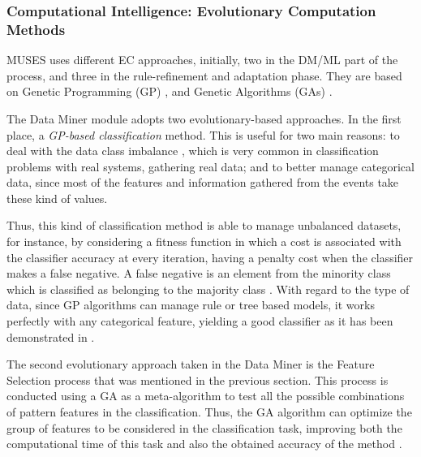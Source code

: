 
%
\subsubsection{Computational Intelligence: Evolutionary Computation Methods}
\label{subsec:ci}


MUSES uses different EC approaches, initially, two in the DM/ML part of the process, and three in the rule-refinement and adaptation phase. They are based on Genetic Programming (GP) \cite{GP_Koza92}, and Genetic Algorithms (GAs) \cite{GAs_Goldberg89}.

The Data Miner module adopts two evolutionary-based approaches. In the first place, a \textit{GP-based classification} method. This is useful for two main reasons: to deal with the data class imbalance \cite{imbalance_techniques_02}, which is very common in classification problems with real systems, gathering real data; and to better manage categorical data, since most of the features and information gathered from the events take these kind of values.

Thus, this kind of classification method is able to manage unbalanced datasets, for instance, by considering a fitness function in which a cost is associated with the classifier accuracy at every iteration, having a penalty cost when the classifier makes a false negative. A false negative is an element from the minority class which is classified as belonging to the majority class \cite{cost_adjustment_07}.
With regard to the type of data, since GP algorithms can manage rule or tree based models, it works perfectly with any categorical feature, yielding a good classifier as it has been demonstrated in \cite{cost_adjustment_07}.

The second evolutionary approach taken in the Data Miner is the Feature Selection process that was mentioned in the previous section. This process is conducted using a GA as a meta-algorithm to test all the possible combinations of pattern features in the classification. Thus, the GA algorithm can optimize the group of features to be considered in the classification task, improving both the computational time of this task and also the obtained accuracy of the method \cite{liu1998feature}.

